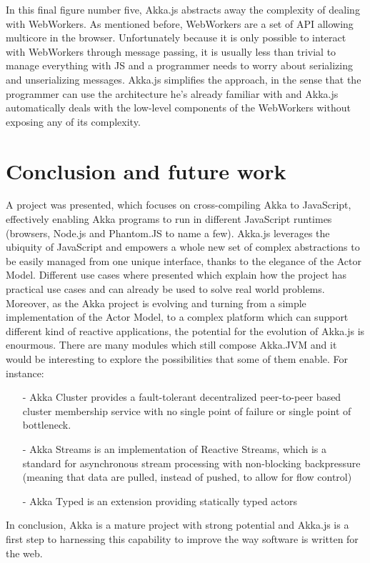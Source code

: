 \documentclass{sig-alternate}
\begin{document}
In this final figure number five, Akka.js abstracts away the complexity of dealing with WebWorkers. As mentioned before, WebWorkers
are a set of API allowing multicore in the browser. Unfortunately because it is only possible to interact with WebWorkers 
through message passing, it is usually less than trivial to manage everything with JS and a programmer needs to worry
about serializing and unserializing messages. Akka.js simplifies the approach, in the sense that the programmer can use
the architecture he's already familiar with and Akka.js automatically deals with the low-level components of the WebWorkers
without exposing any of its complexity.

\section{Conclusion and future work}\label{sec:conclusion}

A project was presented, which focuses on cross-compiling Akka to JavaScript, effectively enabling Akka programs to run in different 
JavaScript runtimes (browsers, Node.js and Phantom.JS to name a few).
Akka.js leverages the ubiquity of JavaScript and empowers a whole new set of complex abstractions to be easily managed from one
unique interface, thanks to the elegance of the Actor Model. Different use cases where presented which explain how the project
has practical use cases and can already be used to solve real world problems.
Moreover, as the Akka project is evolving and turning from a simple implementation of the Actor Model, to a complex platform
which can support different kind of reactive applications, the potential for the evolution of Akka.js is enourmous.
There are many modules which still compose Akka.JVM and it would be interesting to explore the possibilities that some of them
enable. For instance:
\begin{itemize}
\item[-] Akka Cluster provides a fault-tolerant decentralized peer-to-peer based cluster membership service with no single point of failure or single point of bottleneck.
\item[-] Akka Streams is an implementation of Reactive Streams, which is a standard for asynchronous stream processing with non-blocking backpressure (meaning that data 
are pulled, instead of pushed, to allow for flow control)
\item[-] Akka Typed is an extension providing statically typed actors
\end{itemize}
In conclusion, Akka is a mature project with strong potential and Akka.js is a first step to harnessing this capability to 
improve the way software is written for the web.
\end{document}
